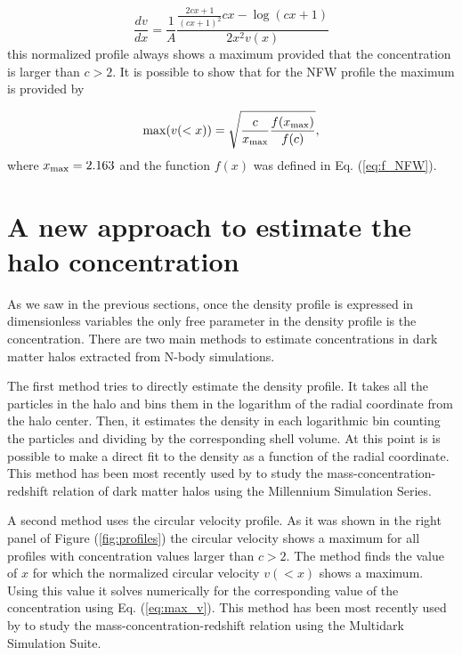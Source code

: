 \documentclass{emulateapj}
\begin{document}
\begin{equation}
\frac{dv}{dx}=\frac{1}{A}\frac{\frac{2cx+1}{\left(cx+1\right)^{2}}cx-\log\left(cx+1\right)}{2x^{2}v\left(x\right)}
\end{equation}
%
this normalized profile always shows a maximum provided that the
concentration is larger than $c>2$.
It is possible to show that for the NFW profile the maximum is
provided by

\begin{equation}
\mathrm{max}(v(<x)) = \sqrt{\frac{c}{x_{\rm max}}\frac{f(x_{\rm
      max})}{f(c)}},
\label{eq:max_v}
\end{equation}
where $x_{\rm max}=2.163$ \citep{Klypin2014} and the function $f(x)$
was defined in Eq. (\ref{eq:f_NFW}).

\section{A new approach to estimate the halo concentration}
\label{sec:method}

As we saw in the previous sections, once the density profile is
expressed in dimensionless variables the only free parameter in the
density profile  is the concentration. There are two main methods to
estimate concentrations in dark matter halos extracted from N-body
simulations.

The first method tries to directly estimate the density profile.
It takes all the particles in the halo and bins them in the logarithm
of the radial coordinate from the halo center.
Then, it estimates the density in each logarithmic bin counting the
particles and dividing by the corresponding shell volume.
At this point is is possible to make a direct fit to the density as a
function of the radial coordinate.
This method has been most recently used by \cite{Ludlow2014} to study
the mass-concentration-redshift relation of dark matter halos using
the Millennium Simulation Series.

A second method uses the circular velocity profile.
As it was shown in the right panel of Figure (\ref{fig:profiles}) the
circular velocity shows a maximum for all profiles with concentration
values larger than $c>2$.
The method finds the value of $x$ for which the normalized circular
velocity $v(<x)$ shows a maximum.
Using this value it solves numerically for the corresponding value of
the concentration using Eq. (\ref{eq:max_v}).
This method has been most recently used by \cite{Klypin2014} to study
the mass-concentration-redshift relation using the Multidark
Simulation Suite.
\end{document}
